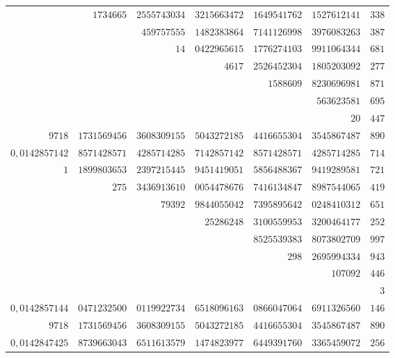 \begin{longtable}{@{}rrrrrrr@{}}
 & $1734665$ & $2555743034$ & $3215663472$ & $1649541762$ & $1527612141$ & $338$\\
 &  & $459757555$ & $1482383864$ & $7141126998$ & $3976083263$ & $387$\\
 &  & $14$ & $0422965615$ & $1776274103$ & $9911064344$ & $681$\\
 &  &  & $4617$ & $2526452304$ & $1805203092$ & $277$\\
 &  &  &  & $1588609$ & $8230696981$ & $871$\\
 &  &  &  &  & $563623581$ & $695$\\
 &  &  &  &  & $20$ & $447$\\
\hline
$9718$ & $1731569456$ & $3608309155$ & $5043272185$ & $4416655304$ & $3545867487$ & $890$\\
\hline
$0{,}0142857142$ & $8571428571$ & $4285714285$ & $7142857142$ & $8571428571$ & $4285714285$ & $714$\\
$1$ & $1899803653$ & $2397215445$ & $9451419051$ & $5856488367$ & $9419289581$ & $721$\\
 & $275$ & $3436913610$ & $0054478676$ & $7416134847$ & $8987544065$ & $419$\\
 &  & $79392$ & $9844055042$ & $7395895642$ & $0248410312$ & $651$\\
 &  &  & $25286248$ & $3100559953$ & $3200464177$ & $252$\\
 &  &  &  & $8525539383$ & $8073802709$ & $997$\\
 &  &  &  & $298$ & $2695994334$ & $943$\\
 &  &  &  &  & $107092$ & $446$\\
 &  &  &  &  &  & $3$\\
\hline
$0{,}0142857144$ & $0471232500$ & $0119922734$ & $6518096163$ & $0866047064$ & $6911326560$ & $146$\\
$9718$ & $1731569456$ & $3608309155$ & $5043272185$ & $4416655304$ & $3545867487$ & $890$\\
\hline
$0{,}0142847425$ & $8739663043$ & $6511613579$ & $1474823977$ & $6449391760$ & $3365459072$ & $256$\\
\end{longtable}\endgroup
